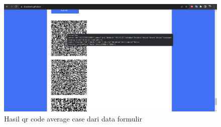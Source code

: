 \begin{figure}[H]
	\centering
	\includegraphics[scale=0.4]{Gambar/formFullQRCode.png}
	\caption{Hasil qr code average case dari data formulir} 
	\label{fig:formFullQRCode}
\end{figure}

